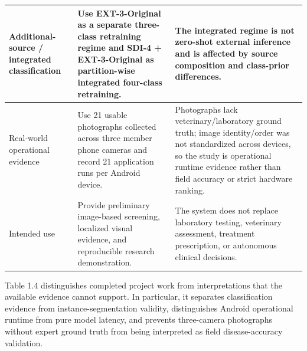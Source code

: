 \documentclass[12pt,a4paper]{report}
\newenvironment{revisionblock}{\begin{snugshade}\noindent}{\end{snugshade}}
\begin{document}
\begin{longtable}{|>{\centering\arraybackslash}p{3.10cm}|>{\centering\arraybackslash}p{6.00cm}|>{\centering\arraybackslash}p{6.70cm}|}
\rowcolor{RevisionYellow}Additional-source / integrated classification & Use EXT-3-Original as a separate three-class retraining regime and SDI-4 + EXT-3-Original as partition-wise integrated four-class retraining. & The integrated regime is not zero-shot external inference and is affected by source composition and class-prior differences. \\ \hline
\rowcolor{RevisionYellow}Real-world operational evidence & Use 21 usable photographs collected across three member phone cameras and record 21 application runs per Android device. & Photographs lack veterinary/laboratory ground truth; image identity/order was not standardized across devices, so the study is operational runtime evidence rather than field accuracy or strict hardware ranking. \\ \hline
\rowcolor{RevisionYellow}Intended use & Provide preliminary image-based screening, localized visual evidence, and reproducible research demonstration. & The system does not replace laboratory testing, veterinary assessment, treatment prescription, or autonomous clinical decisions. \\ \hline
\end{longtable}
\endgroup
\begin{revisionblock}
Table 1.4 distinguishes completed project work from interpretations that the available evidence cannot support. In particular, it separates classification evidence from instance-segmentation validity, distinguishes Android operational runtime from pure model latency, and prevents three-camera photographs without expert ground truth from being interpreted as field disease-accuracy validation.
\end{revisionblock}
\end{document}

